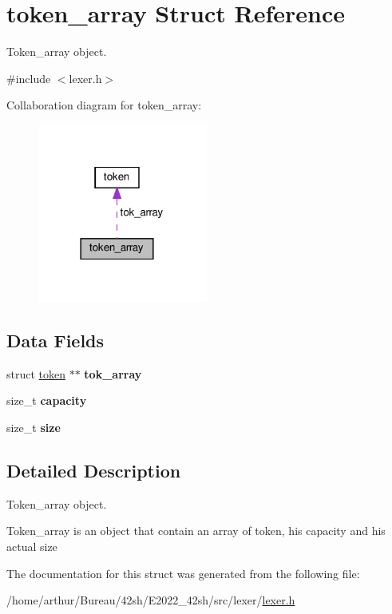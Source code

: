 \hypertarget{structtoken__array}{}\section{token\+\_\+array Struct Reference}
\label{structtoken__array}


Token\+\_\+array object.  




{\ttfamily \#include $<$lexer.\+h$>$}



Collaboration diagram for token\+\_\+array\+:
\nopagebreak
\begin{figure}[H]
\begin{center}
\leavevmode
\includegraphics[width=158pt]{structtoken__array__coll__graph}
\end{center}
\end{figure}
\subsection*{Data Fields}
\begin{DoxyCompactItemize}
\item 
\mbox{\label{structtoken__array_abc84a3cad0fa4504d1c51da206c37845}} 
struct \hyperlink{structtoken}{token} $\ast$$\ast$ {\bfseries tok\+\_\+array}
\item 
\mbox{\label{structtoken__array_ad721fc6ca6a3d6ba3bc506576622aab0}} 
size\+\_\+t {\bfseries capacity}
\item 
\mbox{\label{structtoken__array_a854352f53b148adc24983a58a1866d66}} 
size\+\_\+t {\bfseries size}
\end{DoxyCompactItemize}


\subsection{Detailed Description}
Token\+\_\+array object. 

Token\+\_\+array is an object that contain an array of token, his capacity and his actual size 

The documentation for this struct was generated from the following file\+:\begin{DoxyCompactItemize}
\item 
/home/arthur/\+Bureau/42sh/\+E2022\+\_\+42sh/src/lexer/\hyperlink{lexer_8h}{lexer.\+h}\end{DoxyCompactItemize}
